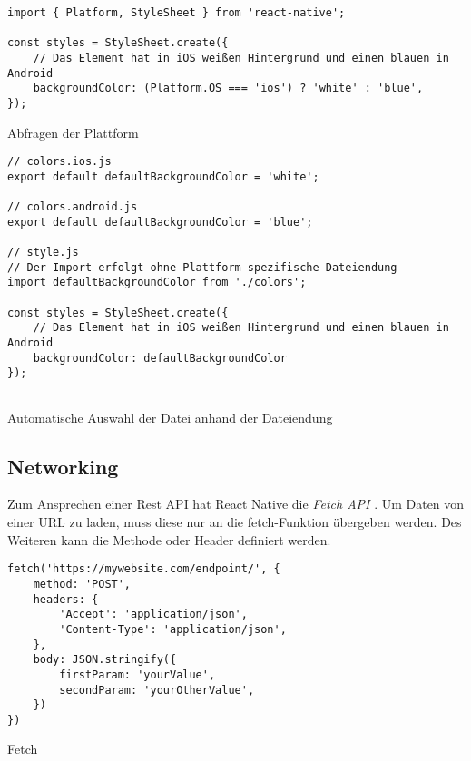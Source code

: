 \begin{listing}[H]
    \begin{verbatim}
import { Platform, StyleSheet } from 'react-native';

const styles = StyleSheet.create({
    // Das Element hat in iOS weißen Hintergrund und einen blauen in Android
    backgroundColor: (Platform.OS === 'ios') ? 'white' : 'blue',
});
    \end{verbatim}
    \caption{Abfragen der Plattform}
    \label{lst:platform_os}
\end{listing}

\begin{listing}[H]
    \begin{verbatim}
// colors.ios.js
export default defaultBackgroundColor = 'white';

// colors.android.js
export default defaultBackgroundColor = 'blue';
 
// style.js
// Der Import erfolgt ohne Plattform spezifische Dateiendung
import defaultBackgroundColor from './colors';
 
const styles = StyleSheet.create({
    // Das Element hat in iOS weißen Hintergrund und einen blauen in Android
    backgroundColor: defaultBackgroundColor
});
     
    \end{verbatim}
    \caption{Automatische Auswahl der Datei anhand der Dateiendung}
    \label{lst:platform_file}
\end{listing}

\subsection{Networking}
Zum Ansprechen einer Rest API hat React Native die \textit{Fetch API} \cite{facebook_inc._fetch_2017}. Um Daten von einer URL zu laden, muss diese nur an die fetch-Funktion übergeben werden. Des Weiteren kann die Methode oder Header definiert werden. 


\begin{listing}[H]
    \begin{verbatim}
fetch('https://mywebsite.com/endpoint/', {
    method: 'POST',
    headers: {
        'Accept': 'application/json',
        'Content-Type': 'application/json',
    },
    body: JSON.stringify({
        firstParam: 'yourValue',
        secondParam: 'yourOtherValue',
    })
})
    \end{verbatim}
    \caption{Fetch \cite{facebook_inc._fetch_2017}}
    \label{lst:fetch}
\end{listing}

